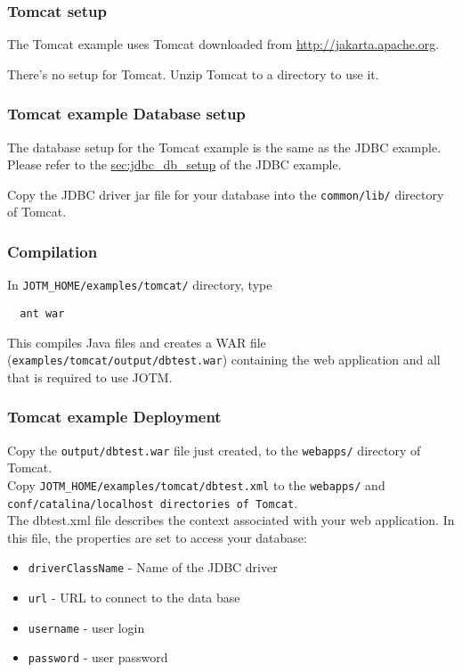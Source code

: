 \documentclass[a4paper,11pt]{article}
\begin{document}
\subsubsection{Tomcat setup}

The Tomcat example uses Tomcat downloaded from
\url{http://jakarta.apache.org}. 

\noindent There's no setup for Tomcat. Unzip Tomcat to a directory to use it.

\subsubsection{Tomcat example Database setup}

The database setup for the Tomcat example is the same as the JDBC example. 
Please refer to the \hyperref{Database setup}{Database setup (section
  }{)}{sec:jdbc_db_setup} of the JDBC example.

\noindent Copy the JDBC driver jar file for your database into the \texttt{common/lib/}
 directory of Tomcat.
\subsubsection{Compilation}
\label{sec:tomcat_compilation}

In \texttt{JOTM\_HOME/examples/tomcat/} directory, type

\begin{verbatim}
  ant war
\end{verbatim}
This compiles Java files and creates a WAR file
(\texttt{examples/tomcat/output/dbtest.war}) containing the web 
application and all that is required to use JOTM. 

\subsubsection{Tomcat example Deployment}
Copy the \texttt{output/dbtest.war} file just created, to the
 \texttt{webapps/} directory of Tomcat.\\

\noindent Copy \texttt{JOTM\_HOME/examples/tomcat/dbtest.xml} to the
\texttt{webapps/} and \texttt{conf/catalina/localhost directories of Tomcat}.\\
The dbtest.xml file describes the context associated with your web
 application. In this file, the properties are set to access your database:
\begin{itemize}
\item \texttt{driverClassName} - Name of the JDBC driver
\item \texttt{url} - URL to connect to the data base
\item \texttt{username} - user login
\item \texttt{password} - user password 
\end{itemize}
\end{document}
